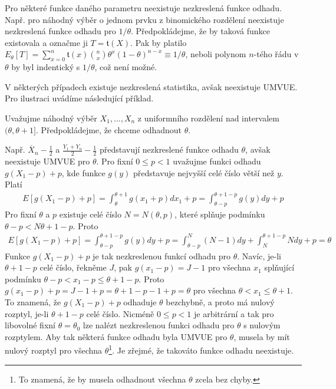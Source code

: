 Pro některé funkce daného parametru neexistuje nezkreslená funkce odhadu. Např. pro náhodný výběr o jednom prvku z binomického rozdělení neexistuje nezkreslená funkce odhadu pro $1/\theta$. Předpokládejme, že by taková funkce existovala a označme ji $T = \mathfrak{t}(X)$. Pak by platilo $E_{\theta}[T] = \sum_{x = 0}^n \mathfrak{t}(x)\binom{n}{x} \theta^x(1 - \theta)^{n - x} \equiv 1/\theta$, neboli polynom $n$-tého řádu v $\theta$ by byl indentický s $1/\theta$, což není možné.

V některých případech existuje nezkreslená statistika, avšak neexistuje UMVUE. Pro ilustraci uvádíme následující příklad.

\begin{example}
Uvažujme náhodný výběr $X_1, ..., X_n$ z uniformního rozdělení nad intervalem $(\theta, \theta + 1]$. Předpokládejme, že chceme odhadnout $\theta$.

Např. $\overline{X}_n - \frac{1}{2}$ a $\frac{Y_1 + Y_n}{2} - \frac{1}{2}$ představují nezkreslené funkce odhadu $\theta$, avšak neexistuje UMVUE pro $\theta$. Pro fixní $0 \le p < 1$ uvažujme funkci odhadu $g(X_1 - p) + p$, kde funkce $g(y)$ představuje nejvyšší celé číslo větší než $y$. Platí
\begin{gather*}
E[g(X_1 - p) + p] = \int_{\theta}^{\theta + 1}g(x_1 + p)d x_1 + p = \int_{\theta - p}^{\theta + 1 - p}g(y)dy + p
\end{gather*}
Pro fixní $\theta$ a $p$ existuje celé číslo $N = N(\theta, p)$, které splňuje podmínku $\theta - p < N \theta + 1 - p$. Proto
\begin{gather*}
E[g(X_1 - p) + p] = \int_{\theta - p}^{\theta + 1 - p}g(y)dy + p = \int_{\theta - p}^N(N - 1)dy + \int_N^{\theta + 1 - p}Ndy + p = \theta
\end{gather*}
Funkce $g(X_1 - p) + p$ je tak nezkreslenou funkcí odhadu pro $\theta$. Navíc, je-li $\theta + 1 - p$ celé číslo, řekněme $J$, pak $g(x_1 - p) = J - 1$ pro všechna $x_1$ splňující podmínku $\theta - p < x_1 - p \le \theta + 1 - p$.  Proto $g(x_1 - p) + p = J - 1 + p = \theta + 1 - p - 1 + p = \theta$ pro všechna $\theta < x_1 \le \theta + 1$. To znamená, že $g(X_1 - p) + p$ odhaduje $\theta$ bezchybně, a proto má nulový rozptyl, je-li $\theta + 1 - p$ celé číslo. Nicméně $0 \le p < 1$ je arbitrární a tak pro libovolné fixní $\theta = \theta_0$ lze nalézt nezkreslenou funkci odhadu pro $\theta$ s nulovým rozptylem. Aby tak některá funkce odhadu byla  UMVUE pro $\theta$, musela by mít nulový rozptyl pro všechna $\theta$\footnote{To znamená, že by musela odhadnout všechna $\theta$ zcela bez chyby.}. Je zřejmé, že takováto funkce odhadu neexistuje.
\end{example}

